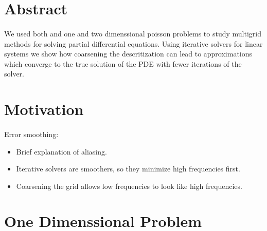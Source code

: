 \documentclass[pdftex,12pt,a4paper]{article}
\begin{document}


\vspace{2 cm}
\section*{Abstract}

   \paragraph*{} We used both and one and two dimenssional poisson problems to study multigrid methods for solving partial differential equations. Using iterative solvers for linear systems we show how coarsening the descritization can lead to approximations which converge to the true solution of the PDE with fewer iterations of the solver. 


\section{Motivation}
   
   \paragraph*{} Error smoothing:

   \begin{itemize}
      \item Brief explanation of aliasing.
      \item Iterative solvers are smoothers, so they minimize high frequencies first.
      \item Coarsening the grid allows low frequencies to look like high frequencies.
   \end{itemize}

\section{One Dimenssional Problem}
   
   \paragraph*{}
\end{document}
